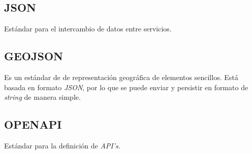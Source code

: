 \subsection{JSON}
Estándar para el intercambio de datos entre servicios.
\subsection{GEOJSON}
Es un estándar de de representación geográfica de elementos sencillos. Está basada en formato \textit{JSON}, por lo que se puede enviar y persistir en formato de \textit{string} de manera simple. \cite{GeoJson}
\subsection{OPENAPI}
Estándar para la definición de \textit{API's}.

